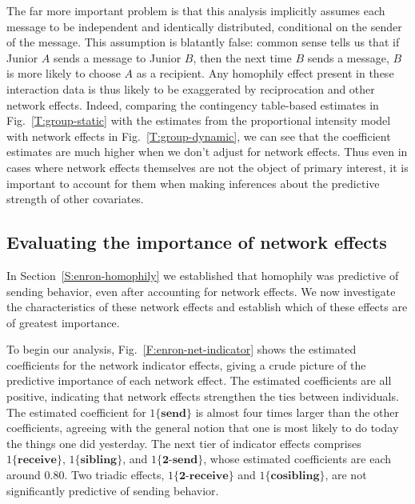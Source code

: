 \documentclass[final]{statsoc}
\begin{document}
The far more important
problem is that this analysis implicitly assumes each message to be
independent and identically distributed, conditional on the sender of
the message.  This assumption is blatantly false: common sense tells us that if Junior $A$ sends a message
to Junior $B$, then the next time $B$ sends a message, $B$ is more likely to
choose $A$ as a recipient.  Any homophily effect present in these interaction
data is thus likely to be exaggerated by reciprocation and other network effects.  Indeed,
comparing the contingency table-based estimates in Fig.~\ref{T:group-static}
with the estimates from the proportional intensity model with network effects
in Fig.~\ref{T:group-dynamic}, we can see that the coefficient estimates are
much higher when we don't adjust for network effects.  Thus even in cases where network effects themselves
are not the object of primary interest, it is important to account for them when
making inferences about the predictive strength of other covariates.

\subsection{Evaluating the importance of network effects}
\label{S:enron-network}

In Section~\ref{S:enron-homophily} we established that homophily was
predictive of sending behavior, even after accounting for network effects.  We
now investigate the characteristics of these network effects and
establish which of these effects are of greatest importance.

To begin our analysis, Fig.~\ref{F:enron-net-indicator} shows the estimated coefficients for the
network indicator effects, giving a crude picture of the predictive importance
of each network effect.  The estimated coefficients are all positive,
indicating that network effects strengthen the ties between individuals.  The
estimated coefficient for $1\{\textbf{send}\}$ is almost four times larger
than the other coefficients, agreeing with the general notion that one is most likely
to do today the things one did yesterday.  The next tier of indicator effects
comprises $1\{\textbf{receive}\}$, $1\{\textbf{sibling}\}$, and
$1\{\textbf{2-send}\}$, whose estimated coefficients are each around $0.80$.
Two triadic effects, $1\{\textbf{2-receive}\}$ and
$1\{\textbf{cosibling}\}$, are not significantly predictive of sending behavior.
\end{document}
